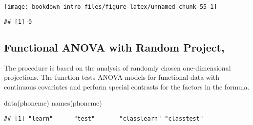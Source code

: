 \documentclass[
]{book}
\newenvironment{Shaded}{\begin{snugshade}}{\end{snugshade}}
\newcommand{\FunctionTok}[1]{\textcolor[rgb]{0.00,0.00,0.00}{#1}}
\newcommand{\NormalTok}[1]{#1}
\newcommand{\SpecialCharTok}[1]{\textcolor[rgb]{0.00,0.00,0.00}{#1}}
\begin{document}
\begin{center}\texttt{[image: bookdown\_intro\_files/figure-latex/unnamed-chunk-55-1]} \end{center}

\begin{Shaded}
\end{Shaded}

\begin{verbatim}
## [1] 0
\end{verbatim}

\hypertarget{functional-anova-with-random-project-cuesta-albertos2010}{%
\subsection{\texorpdfstring{Functional ANOVA with Random Project, \citet{Cuesta-Albertos2010}}{Functional ANOVA with Random Project, @Cuesta-Albertos2010}}\label{functional-anova-with-random-project-cuesta-albertos2010}}

The procedure is based on the analysis of randomly chosen one-dimensional projections. The function tests ANOVA models for functional data with continuous covariates and perform special contrasts for the factors in the formula.

\begin{Shaded}
\begin{Highlighting}[]
\FunctionTok{data}\NormalTok{(phoneme)}
\FunctionTok{names}\NormalTok{(phoneme)}
\end{Highlighting}
\end{Shaded}

\begin{verbatim}
## [1] "learn"      "test"       "classlearn" "classtest"
\end{verbatim}
\end{document}

